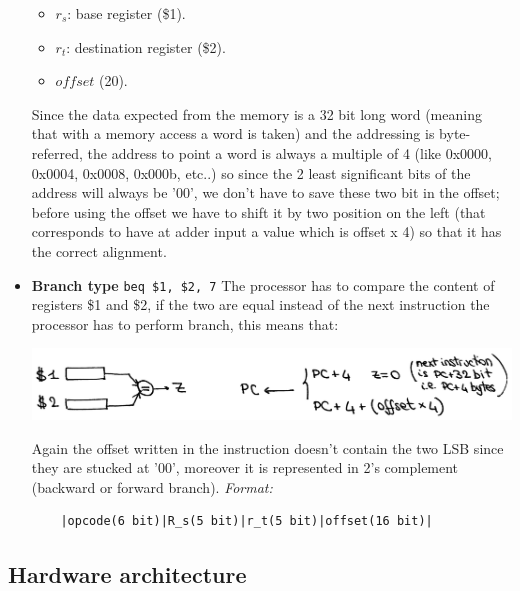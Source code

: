 \begin{itemize}
\begin{itemize}
      \item $r_s$: base register (\$1).
      \item $r_t$: destination register (\$2).
      \item $offset$ (20).
    \end{itemize}
    Since the data expected from the memory is a 32 bit long word (meaning that
    with a memory access a word is taken) and the addressing is byte-referred,
    the address to point a word is always a multiple of 4 (like 0x0000, 0x0004,
    0x0008, 0x000b, etc..) so since the 2 least significant bits of the address
    will always be '00', we don't have to save these two bit in the offset;
    before using the offset we have to shift it by two position on the left
    (that corresponds to have at adder input a value which is offset x 4) so
    that it has the correct alignment.
  \item \textbf{Branch type}
    \verb|beq $1, $2, 7|
    The processor has to compare the content of registers \$1 and \$2, if the
    two are equal instead of the next instruction the processor has to perform
    branch, this means that:
    \begin{center}
      \includegraphics[width=0.85\linewidth]{img/img3/2}
    \end{center}
    Again the offset written in the instruction doesn't contain the two LSB
    since they are stucked at '00', moreover it is represented in 2's complement
    (backward or forward branch).
    \textit{Format:}
    \begin{verbatim}
    |opcode(6 bit)|R_s(5 bit)|r_t(5 bit)|offset(16 bit)|
    \end{verbatim}
\end{itemize}
\subsection{Hardware architecture}
